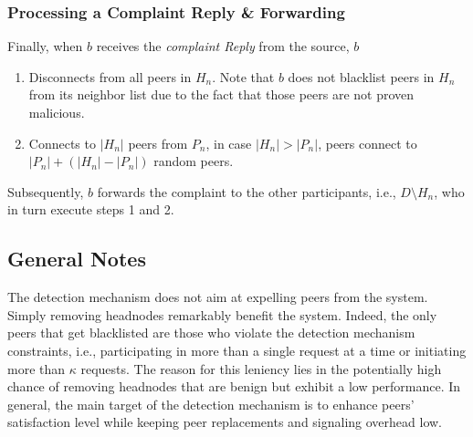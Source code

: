 \subsubsection*{Processing a Complaint Reply \& Forwarding}

Finally, when $b$ receives the \textit{complaint Reply} from the source, $b$ 
\begin{enumerate}
 \item Disconnects from all peers in $H_n$. Note that $b$ does not blacklist peers in $H_n$ from its neighbor list due to the fact that those peers are not proven malicious.
 \item Connects to $|H_n|$ peers from $P_n$, in case $|H_n|>|P_n|$, peers connect to $|P_n|+(|H_n|-|P_n|)$ random peers.
\end{enumerate}
Subsequently, $b$ forwards the complaint to the other participants, i.e., $D \setminus H_n$, who in turn execute steps 1 and 2.

\subsection{General Notes}
The detection mechanism does not aim at expelling peers from the system. Simply removing headnodes remarkably benefit the system.
Indeed, the only peers that get blacklisted are those who violate the detection mechanism constraints, i.e., participating in more than a single request at a time or initiating more than $\kappa$ requests.
The reason for this leniency lies in the potentially high chance of removing headnodes that are benign but exhibit a low performance. 
In general, the main target of the detection mechanism is to enhance peers' satisfaction level while keeping peer replacements and signaling overhead low. 






